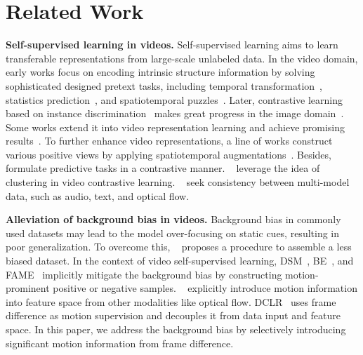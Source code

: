 \documentclass[sigconf,screen]{acmart}
\begin{document}
\section{Related Work}
\noindent
{\bf Self-supervised learning in videos.} Self-supervised learning aims to learn transferable representations from large-scale unlabeled data. In the video domain, early works focus on encoding intrinsic structure information by solving sophisticated designed pretext tasks, including temporal transformation~\cite{speednet,shufflearn,arrowtime,cliporder,PRP,TempTrans}, statistics prediction~\cite{geometryguided,appearancestatistics}, and spatiotemporal puzzles~\cite{cubicpuzzles,videocloze}. Later, contrastive learning based on instance discrimination~\cite{InstDisc} makes great progress in the image domain~\cite{SimCLR,BYOL,MoCov1}. Some works extend it into video representation learning and achieve promising results~\cite{ALargeScale,CVRL}. To further enhance video representations, a line of works construct various positive views by applying spatiotemporal augmentations~\cite{LongShort,GlobalContext,FAME,VideoMoCo,MultiLevel}. Besides, ~\cite{RSPNet,ASCNet,contrastivepretext} formulate predictive tasks in a contrastive manner. ~\cite{AVclustering,SLIC} leverage the idea of clustering in video contrastive learning. ~\cite{AVclustering,VideoText,Broaden} seek consistency between multi-model data, such as audio, text, and optical flow.

\noindent
{\bf Alleviation of background bias in videos.} Background bias in commonly used datasets may lead to the model over-focusing on static cues, resulting in poor generalization. To overcome this, ~\cite{Diving48} proposes a procedure to assemble a less biased dataset. In the context of video self-supervised learning, DSM~\cite{DSM}, BE~\cite{BE}, and FAME~\cite{FAME} implicitly mitigate the background bias by constructing motion-prominent positive or negative samples. ~\cite{MACLR,Mfocused,Msensitive} explicitly introduce motion information into feature space from other modalities like optical flow. DCLR~\cite{Dual} uses frame difference as motion supervision and decouples it from data input and feature space. In this paper, we address the background bias by selectively introducing significant motion information from frame difference. 
\end{document}
